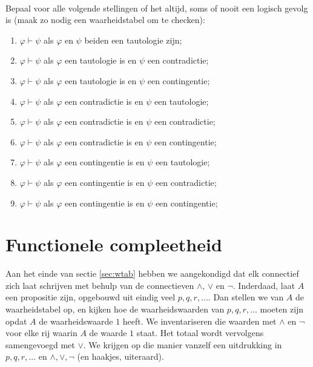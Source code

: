 \begin{exercise}\mbox{}\\
Bepaal voor alle volgende stellingen of het altijd, soms of nooit een logisch gevolg is (maak zo nodig een waarheidstabel om te checken):
\begin{enumerate}[label=\textit{\alph*.}]
\item $\varphi\vdash\psi$ als $\varphi$ en $\psi$ beiden een tautologie zijn;
\item $\varphi\vdash\psi$ als $\varphi$ een tautologie is en $\psi$ een contradictie;
\item $\varphi\vdash\psi$ als $\varphi$ een tautologie is en $\psi$ een contingentie;
\item $\varphi\vdash\psi$ als $\varphi$ een contradictie is en $\psi$ een tautologie;
\item $\varphi\vdash\psi$ als $\varphi$ een contradictie is en $\psi$ een contradictie;
\item $\varphi\vdash\psi$ als $\varphi$ een contradictie is en $\psi$ een contingentie;
\item $\varphi\vdash\psi$ als $\varphi$ een contingentie is en $\psi$ een tautologie;
\item $\varphi\vdash\psi$ als $\varphi$ een contingentie is en $\psi$ een contradictie;
\item $\varphi\vdash\psi$ als $\varphi$ een contingentie is en $\psi$ een contingentie;
\end{enumerate}
\end{exercise}

\section{Functionele compleetheid}\label{sec:volledig}
Aan het einde van sectie \ref{sec:wtab} hebben we aangekondigd dat elk connectief zich laat schrijven met behulp van de connectieven $\land$, $\lor$ en $\neg$. Inderdaad, laat $A$ een propositie zijn, opgebouwd uit eindig veel $p, q, r, \ldots$. Dan stellen we van $A$ de waarheidstabel op, en kijken hoe de waarheidswaarden van $p, q, r, \ldots$ moeten zijn opdat $A$ de waarheidswaarde $1$ heeft. We inventariseren die waarden met $\land$ en $\neg$ voor elke rij waarin $A$ de waarde $1$ staat. Het totaal wordt vervolgens samengevoegd met $\lor$. We krijgen op die manier vanzelf een uitdrukking in $p,q,r,\ldots$ en $\land,\lor,\neg$ (en haakjes, uiteraard).

